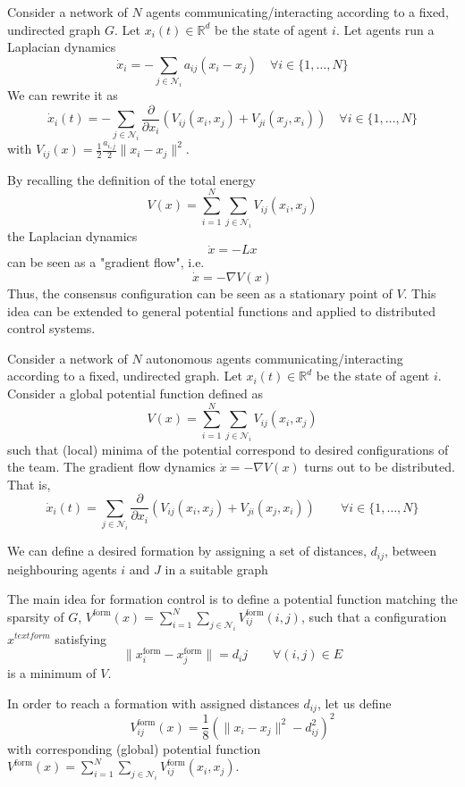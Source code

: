 \documentclass{book}
\newcommand{\R}{\mathbb{R}}
\theoremstyle{theoremv2}
\theoremstyle{defv2}
\theoremstyle{remark}
\theoremstyle{remark}
\theoremstyle{definition}
\theoremstyle{definition}
\begin{document}
Consider a network of $N$ agents communicating/interacting according to a fixed, undirected graph $G$. Let $x_i(t)\in\R^d$ be the state of agent $i$. Let agents run a Laplacian dynamics
\[
    \dot{x}_i = - \displaystyle\sum_{j\in\mathcal{N}_i}a_{ij}(x_i-x_j) \quad \forall i\in\{ 1,\dots,N \}
\]
We can rewrite it as 
\[
    \dot{x}_i(t) = - \displaystyle\sum_{j\in \mathcal{N}_i} \displaystyle\frac{\partial}{\partial x_i}\left(V_{ij}(x_i,x_j)+V_{ji}(x_j,x_i)\right) \quad \forall i \in \{ 1,\dots,N \}
\]
with $V_{ij}(x) = \displaystyle\frac{1}{2}\displaystyle\frac{a_{i,j}}{2}\|x_i-x_j\|^2$.

By recalling the definition of the total energy
\[
    V(x)=\displaystyle\sum_{i=1}^{N}\displaystyle\sum_{j\in\mathcal{N}_i}V_{ij}(x_i,x_j)
\]
the Laplacian dynamics 
\[
    \dot{x} = -Lx
\]
can be seen as a "gradient flow", i.e. 
\[
    \dot{x} = -\nabla V(x)
\]
Thus, the consensus configuration can be seen as a stationary point of $V$. This idea can be extended to general potential functions and applied to distributed control systems.

Consider a network of $N$ autonomous agents communicating/interacting according to a fixed, undirected graph. Let $x_i(t)\in\R^d$ be the state of agent $i$. Consider a global potential function defined as 
\[
    V(x)=\displaystyle\sum_{i=1}^{N}\displaystyle\sum_{j\in\mathcal{N}_i}V_{ij}(x_i,x_j)
\]
such that (local) minima of the potential correspond to desired configurations of the team. The gradient flow dynamics $\dot{x} = -\nabla V(x)$ turns out to be distributed. That is,
 \[
     \dot{x}_i(t) = \displaystyle\sum_{j\in\mathcal{N}_i}\displaystyle\frac{\partial}{\partial x_i}\left(V_{ij}(x_i,x_j)+V_{ji}(x_j,x_i)\right) \qquad \forall i \in \{ 1,\dots,N \}
 \]

 We can define a desired formation by assigning a set of distances, $d_{ij}$, between neighbouring agents $i$ and $J$ in a suitable graph 
 
 The main idea for formation control is to define a potential function matching the sparsity of $G$, $V^{\text{form}}(x) = \sum_{i=1}^{N}\sum_{j\in\mathcal{N}_i}V_{ij}^{\text{form}}(i,j)$, such that a configuration $x^{text{form}}$ satisfying 
 \[
     \|x_i^{\text{form}}-x_j^{\text{form}}\| = d_ij \qquad \forall (i,j)\in E
 \]
 is a minimum of $V$.

 In order to reach a formation with assigned distances $d_{ij}$, let us define 
 \[
     V_{ij}^{\text{form}}(x) = \displaystyle\frac{1}{8} \left(\|x_i-x_j\|^2-d_{ij}^2\right)^2
 \]
 with corresponding (global) potential function $V^{\text{form}}(x) = \displaystyle\sum_{i=1}^{N}\displaystyle\sum_{j\in\mathcal{N}_i}V_{ij}^\text{form}(x_i,x_j)$.
\end{document}
